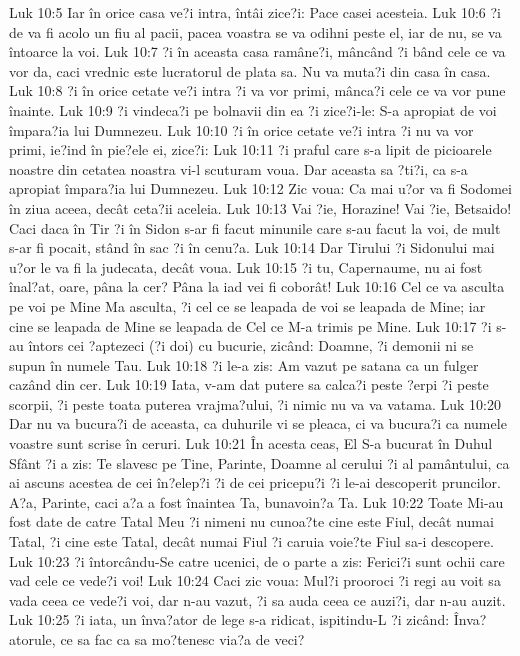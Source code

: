 Luk 10:5  Iar în orice casa ve?i intra, întâi zice?i: Pace casei acesteia.
Luk 10:6  ?i de va fi acolo un fiu al pacii, pacea voastra se va odihni peste el, iar de nu, se va întoarce la voi.
Luk 10:7  ?i în aceasta casa ramâne?i, mâncând ?i bând cele ce va vor da, caci vrednic este lucratorul de plata sa. Nu va muta?i din casa în casa.
Luk 10:8  ?i în orice cetate ve?i intra ?i va vor primi, mânca?i cele ce va vor pune înainte.
Luk 10:9  ?i vindeca?i pe bolnavii din ea ?i zice?i-le: S-a apropiat de voi împara?ia lui Dumnezeu.
Luk 10:10  ?i în orice cetate ve?i intra ?i nu va vor primi, ie?ind în pie?ele ei, zice?i:
Luk 10:11  ?i praful care s-a lipit de picioarele noastre din cetatea noastra vi-l scuturam voua. Dar aceasta sa ?ti?i, ca s-a apropiat împara?ia lui Dumnezeu.
Luk 10:12  Zic voua: Ca mai u?or va fi Sodomei în ziua aceea, decât ceta?ii aceleia.
Luk 10:13  Vai ?ie, Horazine! Vai ?ie, Betsaido! Caci daca în Tir ?i în Sidon s-ar fi facut minunile care s-au facut la voi, de mult s-ar fi pocait, stând în sac ?i în cenu?a.
Luk 10:14  Dar Tirului ?i Sidonului mai u?or le va fi la judecata, decât voua.
Luk 10:15  ?i tu, Capernaume, nu ai fost înal?at, oare, pâna la cer? Pâna la iad vei fi coborât!
Luk 10:16  Cel ce va asculta pe voi pe Mine Ma asculta, ?i cel ce se leapada de voi se leapada de Mine; iar cine se leapada de Mine se leapada de Cel ce M-a trimis pe Mine.
Luk 10:17  ?i s-au întors cei ?aptezeci (?i doi) cu bucurie, zicând: Doamne, ?i demonii ni se supun în numele Tau.
Luk 10:18  ?i le-a zis: Am vazut pe satana ca un fulger cazând din cer.
Luk 10:19  Iata, v-am dat putere sa calca?i peste ?erpi ?i peste scorpii, ?i peste toata puterea vrajma?ului, ?i nimic nu va va vatama.
Luk 10:20  Dar nu va bucura?i de aceasta, ca duhurile vi se pleaca, ci va bucura?i ca numele voastre sunt scrise în ceruri.
Luk 10:21  În acesta ceas, El S-a bucurat în Duhul Sfânt ?i a zis: Te slavesc pe Tine, Parinte, Doamne al cerului ?i al pamântului, ca ai ascuns acestea de cei în?elep?i ?i de cei pricepu?i ?i le-ai descoperit pruncilor. A?a, Parinte, caci a?a a fost înaintea Ta, bunavoin?a Ta.
Luk 10:22  Toate Mi-au fost date de catre Tatal Meu ?i nimeni nu cunoa?te cine este Fiul, decât numai Tatal, ?i cine este Tatal, decât numai Fiul ?i caruia voie?te Fiul sa-i descopere.
Luk 10:23  ?i întorcându-Se catre ucenici, de o parte a zis: Ferici?i sunt ochii care vad cele ce vede?i voi!
Luk 10:24  Caci zic voua: Mul?i prooroci ?i regi au voit sa vada ceea ce vede?i voi, dar n-au vazut, ?i sa auda ceea ce auzi?i, dar n-au auzit.
Luk 10:25  ?i iata, un înva?ator de lege s-a ridicat, ispitindu-L ?i zicând: Înva?atorule, ce sa fac ca sa mo?tenesc via?a de veci?
